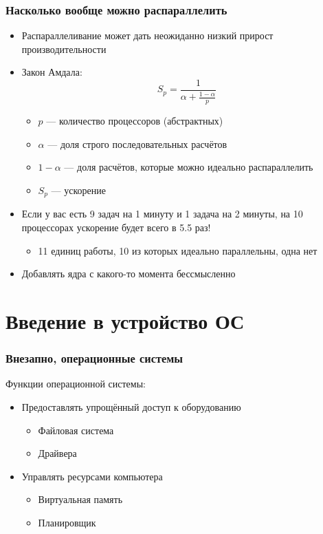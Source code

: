 \documentclass{../../slides-style}
\begin{document}
    \begin{frame}
        \frametitle{Насколько вообще можно распараллелить}
        \begin{itemize}
            \item Распараллеливание может дать неожиданно низкий прирост производительности
            \item Закон Амдала:
                $$S_p = \frac{1}{\alpha + \frac{1 - \alpha}{p}}$$
            \begin{itemize}
                \item $p$ --- количество процессоров (абстрактных)
                \item $\alpha$ --- доля строго последовательных расчётов
                \item $1 - \alpha$ --- доля расчётов, которые можно идеально распараллелить
                \item $S_p$ --- ускорение
            \end{itemize}
            \item Если у вас есть 9 задач на 1 минуту и 1 задача на 2 минуты, на 10 процессорах ускорение будет всего в 5.5 раз!
            \begin{itemize}
                \item 11 единиц работы, 10 из которых идеально параллельны, одна нет
            \end{itemize}
            \item Добавлять ядра с какого-то момента бессмысленно
        \end{itemize}
    \end{frame}

    \section{Введение в устройство ОС}

    \begin{frame}
        \frametitle{Внезапно, операционные системы}
        Функции операционной системы:
        \begin{itemize}
            \item Предоставлять упрощённый доступ к оборудованию
            \begin{itemize}
                \item Файловая система
                \item Драйвера
            \end{itemize}
            \item Управлять ресурсами компьютера
            \begin{itemize}
                \item Виртуальная память
                \item Планировщик
            \end{itemize}
        \end{itemize}
    \end{frame}
\end{document}

